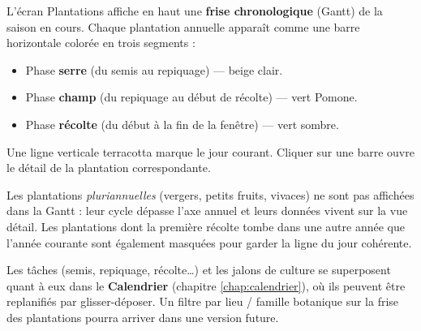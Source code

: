 L'écran Plantations affiche en haut une \textbf{frise chronologique} (Gantt) de la saison en cours. Chaque plantation annuelle apparaît comme une barre horizontale colorée en trois segments :

\begin{itemize}
  \item Phase \textbf{serre} (du semis au repiquage) — beige clair.
  \item Phase \textbf{champ} (du repiquage au début de récolte) — vert Pomone.
  \item Phase \textbf{récolte} (du début à la fin de la fenêtre) — vert sombre.
\end{itemize}

Une ligne verticale terracotta marque le jour courant. Cliquer sur une barre ouvre le détail de la plantation correspondante.

\begin{notebox}
Les plantations \emph{pluriannuelles} (vergers, petits fruits, vivaces) ne sont pas affichées dans la Gantt : leur cycle dépasse l'axe annuel et leurs données vivent sur la vue détail. Les plantations dont la première récolte tombe dans une autre année que l'année courante sont également masquées pour garder la ligne du jour cohérente.
\end{notebox}

Les tâches (semis, repiquage, récolte…) et les jalons de culture se superposent quant à eux dans le \textbf{Calendrier} (chapitre \ref{chap:calendrier}), où ils peuvent être replanifiés par glisser-déposer. Un filtre par lieu / famille botanique sur la frise des plantations pourra arriver dans une version future.
